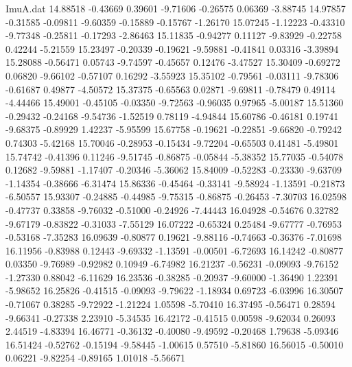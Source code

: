 \begin{filecontents}{ImuA.dat}
  14.88518   -0.43669    0.39601   -9.71606   -0.26575    0.06369   -3.88745
  14.97857   -0.31585   -0.09811   -9.60359   -0.15889   -0.15767   -1.26170
  15.07245   -1.12223   -0.43310   -9.77348   -0.25811   -0.17293   -2.86463
  15.11835   -0.94277    0.11127   -9.83929   -0.22758    0.42244   -5.21559
  15.23497   -0.20339   -0.19621   -9.59881   -0.41841    0.03316   -3.39894
  15.28088   -0.56471    0.05743   -9.74597   -0.45657    0.12476   -3.47527
  15.30409   -0.69272    0.06820   -9.66102   -0.57107    0.16292   -3.55923
  15.35102   -0.79561   -0.03111   -9.78306   -0.61687    0.49877   -4.50572
  15.37375   -0.65563    0.02871   -9.69811   -0.78479    0.49114   -4.44466
  15.49001   -0.45105   -0.03350   -9.72563   -0.96035    0.97965   -5.00187
  15.51360   -0.29432   -0.24168   -9.54736   -1.52519    0.78119   -4.94844
  15.60786   -0.46181    0.19741   -9.68375   -0.89929    1.42237   -5.95599
  15.67758   -0.19621   -0.22851   -9.66820   -0.79242    0.74303   -5.42168
  15.70046   -0.28953   -0.15434   -9.72204   -0.65503    0.41481   -5.49801
  15.74742   -0.41396    0.11246   -9.51745   -0.86875   -0.05844   -5.38352
  15.77035   -0.54078    0.12682   -9.59881   -1.17407   -0.20346   -5.36062
  15.84009   -0.52283   -0.23330   -9.63709   -1.14354   -0.38666   -6.31474
  15.86336   -0.45464   -0.33141   -9.58924   -1.13591   -0.21873   -6.50557
  15.93307   -0.24885   -0.44985   -9.75315   -0.86875   -0.26453   -7.30703
  16.02598   -0.47737    0.33858   -9.76032   -0.51000   -0.24926   -7.44443
  16.04928   -0.54676    0.32782   -9.67179   -0.83822   -0.31033   -7.55129
  16.07222   -0.65324    0.25484   -9.67777   -0.76953   -0.53168   -7.35283
  16.09639   -0.80877    0.19621   -9.88116   -0.74663   -0.36376   -7.01698
  16.11956   -0.83988    0.12443   -9.69332   -1.13591   -0.00501   -6.72693
  16.14242   -0.80877    0.03350   -9.76989   -0.92982    0.10949   -6.74982
  16.21237   -0.56231   -0.09093   -9.76152   -1.27330    0.88042   -6.11629
  16.23536   -0.38285   -0.20937   -9.60000   -1.36490    1.22391   -5.98652
  16.25826   -0.41515   -0.09093   -9.79622   -1.18934    0.69723   -6.03996
  16.30507   -0.71067    0.38285   -9.72922   -1.21224    1.05598   -5.70410
  16.37495   -0.56471    0.28594   -9.66341   -0.27338    2.23910   -5.34535
  16.42172   -0.41515    0.00598   -9.62034    0.26093    2.44519   -4.83394
  16.46771   -0.36132   -0.40080   -9.49592   -0.20468    1.79638   -5.09346
  16.51424   -0.52762   -0.15194   -9.58445   -1.00615    0.57510   -5.81860
  16.56015   -0.50010    0.06221   -9.82254   -0.89165    1.01018   -5.56671

\end{filecontents}
